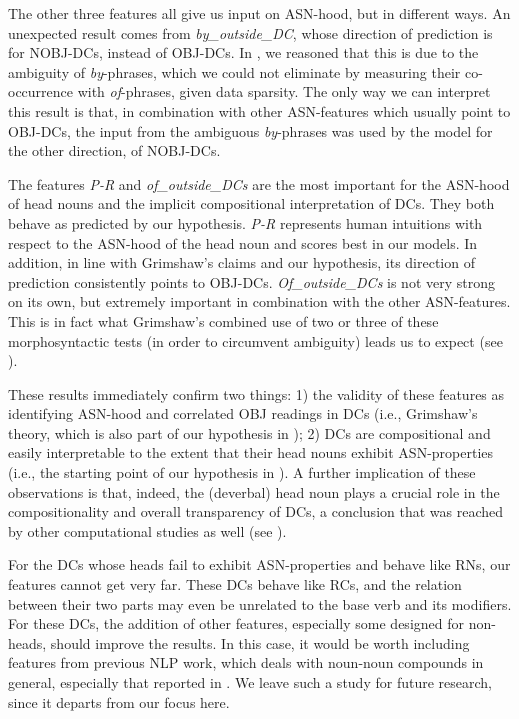 \documentclass[output=paper]{langsci/langscibook}
\begin{document}
The other three features all give us input on ASN-hood, but in different ways. An unexpected result comes from \textit{by\_outside\_DC}, whose direction of prediction is for NOBJ-DCs, instead of OBJ-DCs. In , we reasoned that this is due to the ambiguity of \textit{by}-phrases, which we could not eliminate by measuring their co-occurrence with \textit{of}-phrases, given data sparsity. The only way we can interpret this result is that, in combination with other ASN-features which usually point to OBJ-DCs, the input from the ambiguous \textit{by}-phrases was used by the model for the other direction, of NOBJ-DCs.

The features \textit{P-R} and \textit{of\_outside\_DCs} are the most important for the ASN-hood of head nouns and the implicit compositional interpretation of DCs. They both behave as predicted by our hypothesis. \textit{P-R} represents human intuitions with respect to the ASN-hood of the head noun and scores best in our models. In addition, in line with Grimshaw's claims and our hypothesis, its direction of prediction consistently points to OBJ-DCs. \textit{Of\_outside\_DCs} is not very strong on its own, but extremely important in combination with the other ASN-features. This is in fact what Grimshaw's combined use of two or three of these morphosyntactic tests (in order to circumvent ambiguity) leads us to expect (see ).

These results immediately confirm two things: 1) the validity of these features as identifying ASN-hood and correlated OBJ readings in DCs (i.e., Grimshaw's theory, which is also part of our hypothesis in ); 2) DCs are compositional and easily interpretable to the extent that their head nouns exhibit ASN-properties (i.e., the starting point of our hypothesis in ). A further implication of these observations is that, indeed, the (deverbal) head noun  plays a crucial role in the compositionality  {and overall} transparency of DCs, a conclusion that was reached by other computational studies as well (see ). 

For the DCs whose heads fail to exhibit ASN-properties and behave like RNs, our features cannot get very far.  {These DCs behave like RCs, and the relation between their two parts may even be unrelated to the base verb and its modifiers.} For these DCs, the addition of other features, especially some designed for non-heads, should improve the results. In this case, it would be worth including features from previous NLP work, which deals with noun-noun compounds in general, especially that reported in . 
 {We leave such a study for future research, since it departs from our focus here.}
\end{document}
